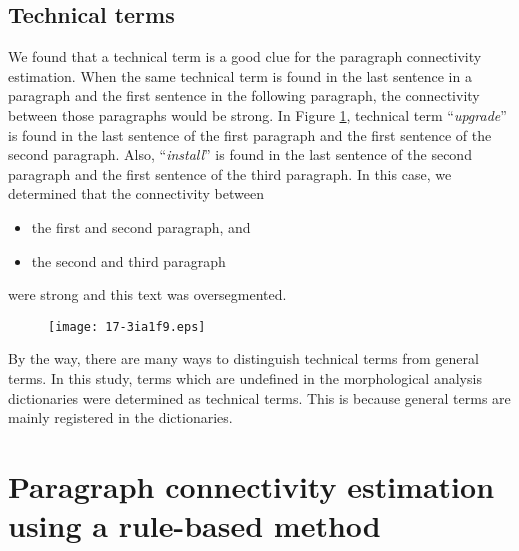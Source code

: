 \documentclass[english]{jnlp_1.4}
\begin{document}
\subsection{Technical terms}
\label{subsec:Technical terms}


We found that 
\pagebreak
a technical term is a good clue for the paragraph connectivity estimation.
When the same technical term is found 
in the last sentence in a paragraph and  
the first sentence in the following paragraph,  
the connectivity between those paragraphs would be strong.
In Figure \ref{fig:a strong connectity case:the same technical terms}, 
technical term ``\textit{upgrade}'' is found 
in the last sentence of the first paragraph and 
the first sentence of the second paragraph.
Also, 
``\textit{install}'' is found 
in the last sentence of the second paragraph and 
the first sentence of the third paragraph.
In this case, 
we determined that the connectivity between 
\begin{itemize}
 \item the first and second paragraph, and 
 \item the second and third paragraph 
\end{itemize}
were strong and 
this text was oversegmented.

\begin{figure}[t]
\begin{center}
\texttt{[image: 17-3ia1f9.eps]}
\end{center}
\label{fig:a strong connectity case:the same technical terms}
\end{figure}

By the way, 
there are many ways to distinguish technical terms from general terms.
In this study, 
terms which are undefined in the morphological analysis dictionaries
were determined as technical terms.
This is because 
general terms are mainly registered in the dictionaries.





\section{Paragraph connectivity estimation using a rule-based method}
\label{sec:Paragraph connectivity estimation using a rule-based method}
\end{document}
